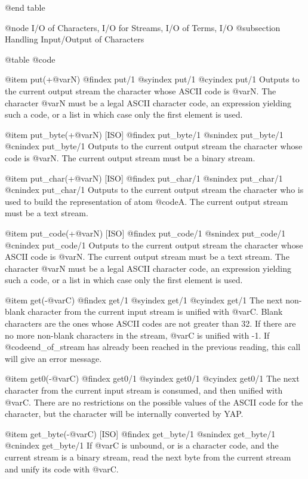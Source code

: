 {{{{{@end table

@node I/O of Characters, I/O for Streams, I/O of Terms, I/O
@subsection Handling Input/Output of Characters

@table @code

@item put(+@var{N})
@findex put/1
@syindex put/1
@cyindex put/1
Outputs to the current output stream the character whose ASCII code is
@var{N}. The character @var{N} must be a legal ASCII character code, an
expression yielding such a code, or a list in which case only the first
element is used.

@item put_byte(+@var{N}) [ISO]
@findex put_byte/1
@snindex put_byte/1
@cnindex put_byte/1
Outputs to the current output stream the character whose code is
@var{N}. The current output stream must be a binary stream.

@item put_char(+@var{N}) [ISO]
@findex put_char/1
@snindex put_char/1
@cnindex put_char/1
Outputs to the current output stream the character who is used to build
the representation of atom @code{A}. The current output stream must be a
text stream.

@item put_code(+@var{N}) [ISO]
@findex put_code/1
@snindex put_code/1
@cnindex put_code/1
Outputs to the current output stream the character whose ASCII code is
@var{N}. The current output stream must be a text stream. The character
@var{N} must be a legal ASCII character code, an expression yielding such
a code, or a list in which case only the first element is used.

@item get(-@var{C})
@findex get/1
@syindex get/1
@cyindex get/1
The next non-blank character from the current input stream is unified
with @var{C}. Blank characters are the ones whose ASCII codes are not
greater than 32. If there are no more non-blank characters in the
stream, @var{C} is unified with -1. If @code{end_of_stream} has already
been reached in the previous reading, this call will give an error message.

@item get0(-@var{C})
@findex get0/1
@syindex get0/1
@cyindex get0/1
The next character from the current input stream is consumed, and then
unified with @var{C}. There are no restrictions on the possible
values of the ASCII code for the character, but the character will be
internally converted by YAP.

@item get_byte(-@var{C}) [ISO]
@findex get_byte/1
@snindex get_byte/1
@cnindex get_byte/1
If @var{C} is unbound, or is a character code, and the current stream is a
binary stream, read the next byte from the current stream and unify its
code with @var{C}.

}}}}}

